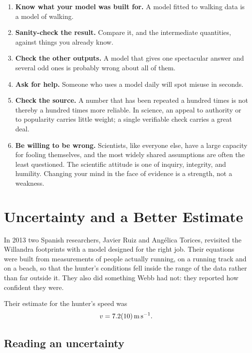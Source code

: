 \documentclass[11pt,twoside,openany]{book}
\newcounter{check}[chapter]
\begin{document}
\begin{modelnote}
\begin{enumerate}[itemsep=2pt]
  \item \textbf{Know what your model was built for.} A model fitted to walking data is a model of walking.
  \item \textbf{Sanity-check the result.} Compare it, and the intermediate quantities, against things you already know.
  \item \textbf{Check the other outputs.} A model that gives one spectacular answer and several odd ones is probably wrong about all of them.
  \item \textbf{Ask for help.} Someone who uses a model daily will spot misuse in seconds.
  \item \textbf{Check the source.} A number that has been repeated a hundred times is not thereby a hundred times more reliable. In science, an appeal to authority or to popularity carries little weight; a single verifiable check carries a great deal.
  \item \textbf{Be willing to be wrong.} Scientists, like everyone else, have a large capacity for fooling themselves, and the most widely shared assumptions are often the least questioned. The scientific attitude is one of inquiry, integrity, and humility. Changing your mind in the face of evidence is a strength, not a weakness.
\end{enumerate}
\end{modelnote}

\section{Uncertainty and a Better Estimate}
\label{sec:uncertainty}

In 2013 two Spanish researchers, Javier Ruiz and Ang\'elica Torices, revisited the Willandra footprints with a model designed for the right job. Their equations were built from measurements of people actually running, on a running track and on a beach, so that the hunter's conditions fell inside the range of the data rather than far outside it. They also did something Webb had not: they reported how confident they were.

Their estimate for the hunter's speed was
\[
v = \SI{7.2 \pm 1.0}{\metre\per\second}.
\]

\subsection{Reading an uncertainty}
\end{document}
